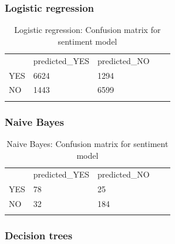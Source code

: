 \subsubsection{Logistic regression}

\begin{table}[]
\centering
\begin{tabular}{lllll}
\cline{1-3}
\multicolumn{1}{|l|}{}   & \multicolumn{1}{l|}{predicted\_YES} & \multicolumn{1}{l|}{predicted\_NO}  &  &  \\ \cline{1-3}
\multicolumn{1}{|l|}{YES} & \multicolumn{1}{l|}{6624}  & \multicolumn{1}{l|}{1294} &  &  \\ \cline{1-3}
\multicolumn{1}{|l|}{NO}   & \multicolumn{1}{l|}{1443}  & \multicolumn{1}{l|}{6599}  &  &  \\ \cline{1-3}
                            &                           &                           &  & 
\end{tabular}
\caption{Logistic regression: Confusion matrix for sentiment model}
\label{tab:confusionmatrix_migrationtweets}
\end{table}



\subsubsection{Naive Bayes}



\begin{table}[]
\centering
\begin{tabular}{lllll}
\cline{1-3}
\multicolumn{1}{|l|}{}   & \multicolumn{1}{l|}{predicted\_YES} & \multicolumn{1}{l|}{predicted\_NO}  &  &  \\ \cline{1-3}
\multicolumn{1}{|l|}{YES} & \multicolumn{1}{l|}{78}  & \multicolumn{1}{l|}{25} &  &  \\ \cline{1-3}
\multicolumn{1}{|l|}{NO}   & \multicolumn{1}{l|}{32}  & \multicolumn{1}{l|}{184}  &  &  \\ \cline{1-3}
                            &                           &                           &  & 
\end{tabular}
\caption{Naive Bayes: Confusion matrix for sentiment model}
\label{tab:confusionmatrix_migrationtweets}
\end{table}



\subsubsection{Decision trees}



